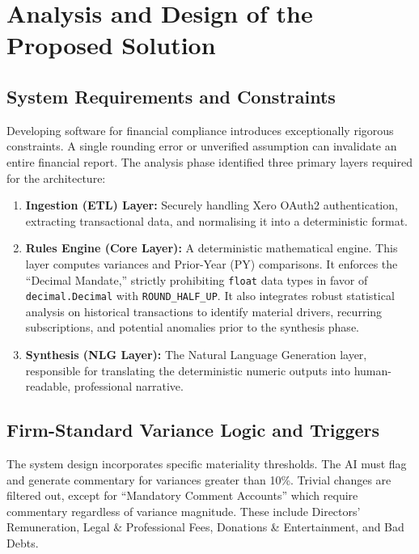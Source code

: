 \chapter{Analysis and Design of the Proposed Solution}
\label{chap:analysis_design}

\section{System Requirements and Constraints}
Developing software for financial compliance introduces exceptionally rigorous constraints. A single rounding error or unverified assumption can invalidate an entire financial report. The analysis phase identified three primary layers required for the architecture:
\begin{enumerate}
    \item \textbf{Ingestion (ETL) Layer:} Securely handling Xero OAuth2 authentication, extracting transactional data, and normalising it into a deterministic format.
    \item \textbf{Rules Engine (Core Layer):} A deterministic mathematical engine. This layer computes variances and Prior-Year (PY) comparisons. It enforces the ``Decimal Mandate,'' strictly prohibiting \texttt{float} data types in favor of \texttt{decimal.Decimal} with \texttt{ROUND\_HALF\_UP}. It also integrates robust statistical analysis on historical transactions to identify material drivers, recurring subscriptions, and potential anomalies prior to the synthesis phase.
    \item \textbf{Synthesis (NLG Layer):} The Natural Language Generation layer, responsible for translating the deterministic numeric outputs into human-readable, professional narrative.
\end{enumerate}

\section{Firm-Standard Variance Logic and Triggers}
The system design incorporates specific materiality thresholds. The AI must flag and generate commentary for variances greater than 10\%. Trivial changes are filtered out, except for ``Mandatory Comment Accounts'' which require commentary regardless of variance magnitude. These include Directors' Remuneration, Legal \& Professional Fees, Donations \& Entertainment, and Bad Debts.

